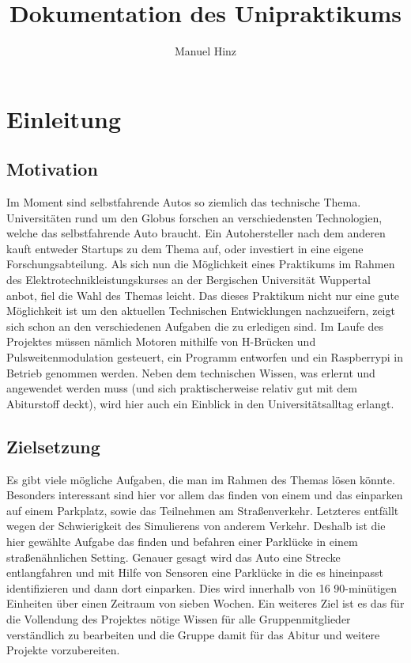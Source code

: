 \documentclass{report}
\author{Manuel Hinz}
\title{Dokumentation des Unipraktikums}
\begin{document}
\maketitle

\tableofcontents
\newpage

\chapter{Einleitung}

\section{Motivation}
Im Moment sind selbstfahrende Autos so ziemlich das technische Thema. Universit\"{a}ten rund um den Globus forschen an verschiedensten Technologien, welche das selbstfahrende Auto braucht. Ein Autohersteller nach dem anderen kauft entweder Startups zu dem Thema auf, oder investiert in eine eigene Forschungsabteilung. Als sich nun die M\"{o}glichkeit eines Praktikums im Rahmen des Elektrotechnikleistungskurses an der Bergischen Universit\"{a}t Wuppertal anbot, fiel die Wahl des Themas leicht. Das dieses Praktikum nicht nur eine gute M\"{o}glichkeit ist um den aktuellen Technischen Entwicklungen nachzueifern, zeigt sich schon an den verschiedenen Aufgaben die zu erledigen sind. Im Laufe des Projektes m\"{u}ssen n\"{a}mlich Motoren mithilfe von H-Br\"{u}cken und Pulsweitenmodulation gesteuert, ein Programm entworfen und ein Raspberrypi in Betrieb genommen werden. Neben dem technischen Wissen, was erlernt und angewendet werden muss (und sich praktischerweise relativ gut mit dem Abiturstoff deckt), wird hier auch ein Einblick in den Universit\"{a}tsalltag erlangt.  
\section{Zielsetzung}
Es gibt viele m\"{o}gliche Aufgaben, die man im Rahmen des Themas l\"{o}sen k\"{o}nnte. Besonders interessant sind hier vor allem das finden von einem und das einparken auf einem Parkplatz, sowie das Teilnehmen am Stra{\ss}enverkehr. Letzteres entf\"{a}llt wegen der Schwierigkeit des Simulierens von anderem Verkehr. Deshalb ist die hier gew\"{a}hlte Aufgabe das finden und befahren einer Parkl\"{u}cke in einem stra{\ss}en\"{a}hnlichen Setting. Genauer gesagt wird das Auto eine Strecke entlangfahren und mit Hilfe von Sensoren eine Parkl\"{u}cke in die es hineinpasst identifizieren und dann dort einparken. Dies wird innerhalb von 16 90-min\"{u}tigen Einheiten \"{u}ber einen Zeitraum von sieben Wochen. Ein weiteres Ziel ist es das f\"{u}r die Vollendung des Projektes n\"{o}tige Wissen f\"{u}r alle Gruppenmitglieder verst\"{a}ndlich zu bearbeiten und die Gruppe damit f\"{u}r das Abitur und weitere Projekte vorzubereiten.
\end{document}
